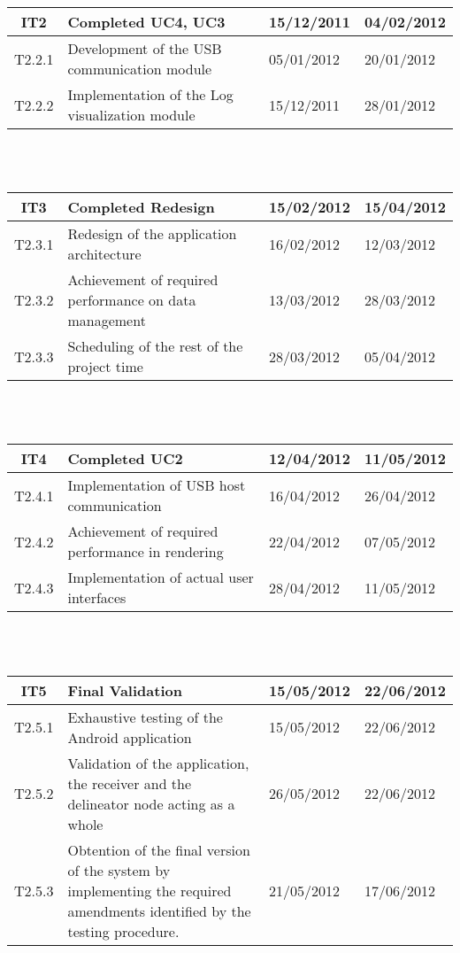 		\begin{tabular}{| c | p{6cm} | l | l |} %
		\hline
IT2 & Completed UC4, UC3 & 15/12/2011 & 04/02/2012\\ \hline
   T2.2.1 & Development of the USB communication module & 05/01/2012 & 20/01/2012\\ \hline
   T2.2.2 & Implementation of the Log visualization module & 15/12/2011 & 28/01/2012\\
		\hline
		\end{tabular}\\\\

		\begin{tabular}{| c | p{6cm} | l | l |} %
		\hline
IT3 & Completed Redesign & 15/02/2012 & 15/04/2012\\ \hline
   T2.3.1 & Redesign of the application architecture & 16/02/2012 & 12/03/2012\\ \hline
   T2.3.2 & Achievement of required performance on data management & 13/03/2012 & 28/03/2012\\ \hline
   T2.3.3 & Scheduling of the rest of the project time & 28/03/2012 & 05/04/2012\\
		\hline
		\end{tabular}\\\\

		\begin{tabular}{| c | p{6cm} | l | l |} %
		\hline
IT4 & Completed UC2 & 12/04/2012 & 11/05/2012\\ \hline
   T2.4.1 & Implementation of USB host communication & 16/04/2012 & 26/04/2012\\ \hline
   T2.4.2 & Achievement of required performance in rendering & 22/04/2012 & 07/05/2012\\ \hline
   T2.4.3 & Implementation of actual user interfaces & 28/04/2012 & 11/05/2012\\
		\hline
		\end{tabular}\\\\

		\begin{tabular}{| c | p{6cm} | l | l |} %
		\hline
IT5 & Final Validation & 15/05/2012 & 22/06/2012\\ \hline
   T2.5.1 & Exhaustive testing of the Android application & 15/05/2012 & 22/06/2012\\ \hline
   T2.5.2 & Validation of the application, the receiver and the delineator node acting as a whole & 26/05/2012 & 22/06/2012\\ \hline
   T2.5.3 & Obtention of the final version of the system by implementing the required amendments identified by the testing procedure. & 21/05/2012 & 17/06/2012\\
		\hline
		\end{tabular}\\\\

